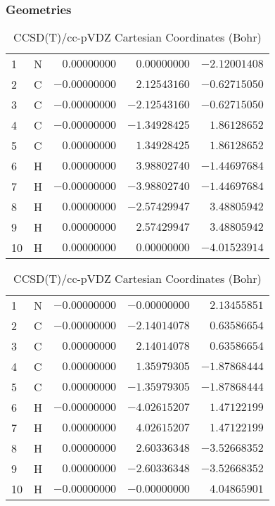\documentclass[10pt,oneside]{article}
\begin{document}
\begin{table}[h!]
\subsubsection*{Geometries}
\begin{multicols}{2}
\centering
\caption{CCSD(T)/cc-pVTZ Cartesian Coordinates (Bohr)}
\begin{tabular}{llrrr}
\toprule
1  & N  & $ 0.00000000$ & $ 0.00000000$ & $-2.12001408$ \\
2  & C  & $-0.00000000$ & $ 2.12543160$ & $-0.62715050$ \\
3  & C  & $-0.00000000$ & $-2.12543160$ & $-0.62715050$ \\
4  & C  & $-0.00000000$ & $-1.34928425$ & $ 1.86128652$ \\
5  & C  & $ 0.00000000$ & $ 1.34928425$ & $ 1.86128652$ \\
6  & H  & $ 0.00000000$ & $ 3.98802740$ & $-1.44697684$ \\
7  & H  & $-0.00000000$ & $-3.98802740$ & $-1.44697684$ \\
8  & H  & $ 0.00000000$ & $-2.57429947$ & $ 3.48805942$ \\
9  & H  & $ 0.00000000$ & $ 2.57429947$ & $ 3.48805942$ \\
10 & H  & $ 0.00000000$ & $ 0.00000000$ & $-4.01523914$ \\
\bottomrule
\end{tabular}
\caption{CCSD(T)/cc-pVDZ Cartesian Coordinates (Bohr)}
\begin{tabular}{llrrr}
\toprule
1  & N  & $-0.00000000$ & $-0.00000000$ & $ 2.13455851$ \\
2  & C  & $-0.00000000$ & $-2.14014078$ & $ 0.63586654$ \\
3  & C  & $ 0.00000000$ & $ 2.14014078$ & $ 0.63586654$ \\
4  & C  & $ 0.00000000$ & $ 1.35979305$ & $-1.87868444$ \\
5  & C  & $ 0.00000000$ & $-1.35979305$ & $-1.87868444$ \\
6  & H  & $-0.00000000$ & $-4.02615207$ & $ 1.47122199$ \\
7  & H  & $ 0.00000000$ & $ 4.02615207$ & $ 1.47122199$ \\
8  & H  & $ 0.00000000$ & $ 2.60336348$ & $-3.52668352$ \\
9  & H  & $ 0.00000000$ & $-2.60336348$ & $-3.52668352$ \\
10 & H  & $-0.00000000$ & $-0.00000000$ & $ 4.04865901$ \\
\bottomrule
\end{tabular}
\end{multicols}
\end{table}
\end{document}
